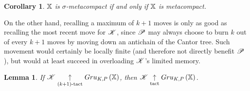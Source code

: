 \documentclass{amsart}
\newtheorem{lemma}[theorem]{Lemma}
\newtheorem{corollary}[theorem]{Corollary}
\theoremstyle{definition}
\begin{document}
\begin{corollary}
  $\mathbb{X}$ is $\sigma$-metacompact if and only if $\mathbb{X}$ is metacompact.
\end{corollary}

On the other hand, recalling a maximum of $k+1$ moves is only as good as
recalling the most recent move for $\mathscr{K}$, since $\mathscr{P}$ may always choose
to burn $k$ out of every $k+1$ moves
by moving down an antichain of the Cantor tree. Such movement would certainly
be locally finite (and therefore not directly benefit $\mathscr{P}$), but would
at least succeed in overloading $\mathscr{K}$'s limited memory.

\begin{lemma}
  If $\mathscr{K}\underset{(k+1)\text{-tact}}{\uparrow}Gru_{K,P}\left({\mathbb{X}}\right)$, then
  $\mathscr{K}\underset{\text{tact}}{\uparrow}Gru_{K,P}\left({\mathbb{X}}\right)$.
\end{lemma}
\end{document}
